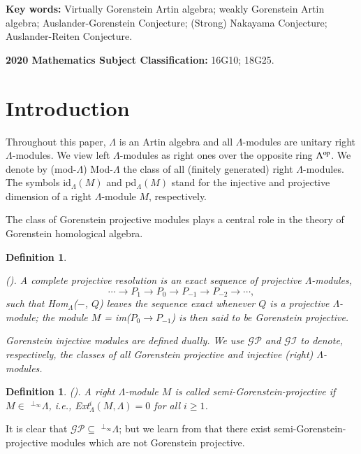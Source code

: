 \documentclass[11pt,a4paper]{article}
\newtheorem{defn}[thm]{Definition}
\begin{document}
\textbf{Key words:}    Virtually
Gorenstein Artin algebra;  weakly Gorenstein Artin algebra; Auslander-Gorenstein Conjecture;   (Strong) Nakayama Conjecture; Auslander-Reiten  Conjecture.

\medskip

\textbf{2020 Mathematics Subject Classification:}  16G10; 18G25.



\section{ Introduction}



Throughout this paper, $\Lambda$ is an Artin algebra and
all $\Lambda$-modules are unitary  right  $\Lambda$-modules. We view left $\Lambda$-modules as right  ones over
the opposite ring $\Lambda^{{\rm op}}$. We denote by (mod-$\Lambda$)  Mod-$\Lambda$ the class of all  (finitely generated) right    $\Lambda$-modules.
The symbols  id$_{\Lambda}$$(M)$ and pd$_{\Lambda}$$(M)$  stand  for the   injective and projective   dimension of
  a  right $\Lambda$-module $M$, respectively.

The class of Gorenstein projective  modules plays a central role in the theory of Gorenstein homological algebra.

\begin{defn} \label{defn1} \rm{  (\cite{eno9}).
 A  {\it  complete projective resolution} is an exact sequence of projective
 $\Lambda$-modules,  $$\cdots  \rightarrow P_{1} \rightarrow P_{0}\rightarrow
P_{-1}\rightarrow P_{-2}\rightarrow \cdots,  $$
 such that Hom$_{\Lambda}$($-$, $Q$) leaves the sequence exact whenever $Q$ is a projective   $\Lambda$-module; the module $M$ = im($P_{0}\rightarrow
P_{-1}$) is then  said to be {\it Gorenstein  projective}.

{\it Gorenstein  injective }  modules are defined dually.
 We use $\mathscr{GP}$ and $\mathscr{GI}$    to denote, respectively,  the classes of all Gorenstein  projective and  injective
   (right)  $\Lambda$-modules. }\end{defn}

\begin{defn} \label{defn81} \rm{   (\cite{rz1}).
 A right $\Lambda$-module
$M$   is called   {\it semi-Gorenstein-projective} if $M\in$ $^{\perp_{\infty}}{\Lambda}$, i.e.,    Ext$ _{\Lambda}^{i}(M, \Lambda)=0$  for all  $i \geq 1$.
 }\end{defn}


It is clear that $\mathscr{GP} \subseteq$  $^{\perp_{\infty}}{\Lambda}$; but we learn from   \cite{rz1}
that   there exist  semi-Gorenstein-projective modules which are not Gorenstein projective.
\end{document}
